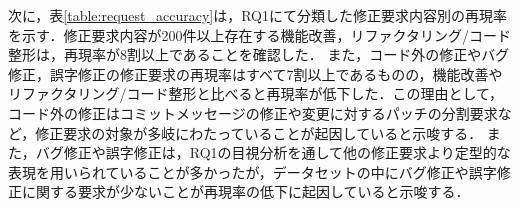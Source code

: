 \documentclass[submit,techrep,noauthor]{ipsj}
\begin{document}
\begin{table}[t]
\centering
  \caption{修正要求コメントの予測精度}
  \label{table:label_score}
\end{table}

次に，表\ref{table:request_accuracy}は，RQ1にて分類した修正要求内容別の再現率を示す．修正要求内容が200件以上存在する機能改善，リファクタリング/コード整形は，再現率が8割以上であることを確認した．
また，コード外の修正やバグ修正，誤字修正の修正要求の再現率はすべて7割以上であるものの，機能改善やリファクタリング/コード整形と比べると再現率が低下した．この理由として，コード外の修正はコミットメッセージの修正や変更に対するパッチの分割要求など，修正要求の対象が多岐にわたっていることが起因していると示唆する．
また，バグ修正や誤字修正は，RQ1の目視分析を通して他の修正要求より定型的な表現を用いられていることが多かったが，データセットの中にバグ修正や誤字修正に関する要求が少ないことが再現率の低下に起因していると示唆する．

\begin{table}[t]
\centering
  \caption{修正要求内容毎の再現率}
  \label{table:request_accuracy}
\end{table}
\end{document}
